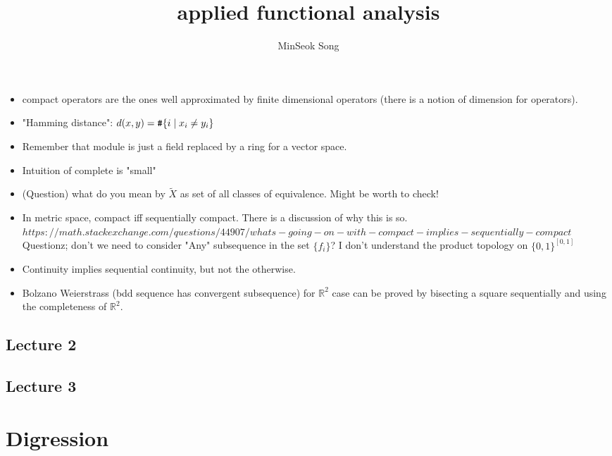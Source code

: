 \documentclass{article}
\title{applied functional analysis}
\author{MinSeok Song}
\date{}
\theoremstyle{remark}
\begin{document}
\maketitle 
\begin{itemize}
\item compact operators are the ones well approximated by finite dimensional operators (there is a notion of dimension for operators).
\item "Hamming distance": $d(x,y)=\verb|#|\{i\mid x_i\neq y_i\}$
\item Remember that module is just a field replaced by a ring for a vector space.
\item Intuition of complete is "small"
\item (Question) what do you mean by $\tilde X$ as set of all classes of equivalence. Might be worth to check!
\item In metric space, compact iff sequentially compact.
There is a discussion of why this is so. $https://math.stackexchange.com/questions/44907/whats-going-on-with-compact-implies-sequentially-compact$ Questionz; don't we need to consider "Any" subsequence in the set $\{f_i\}$? I don't understand the product topology on $\{0,1\}^{[0,1]}$
\item Continuity implies sequential continuity, but not the otherwise. 
\item Bolzano Weierstrass (bdd sequence has convergent subsequence) for $\mathbb{R}^2$ case can be proved by bisecting a square sequentially and using the completeness of $\mathbb{R}^2$.
\end{itemize}

\subsection*{Lecture 2}
\subsection*{Lecture 3}



\newpage
\section*{Digression}
\end{document}
